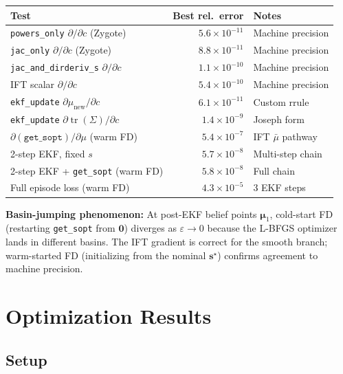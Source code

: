\documentclass[11pt,a4paper]{article}
\newcommand{\tr}{\operatorname{tr}}
\begin{document}
\begin{center}
\begin{tabular}{@{}lrl@{}}
\toprule
Test & Best rel.\ error & Notes \\
\midrule
\texttt{powers\_only} $\partial/\partial c$ (Zygote) & $5.6 \times 10^{-11}$ & Machine precision \\
\texttt{jac\_only} $\partial/\partial c$ (Zygote) & $8.8 \times 10^{-11}$ & Machine precision \\
\texttt{jac\_and\_dirderiv\_s} $\partial/\partial c$ & $1.1 \times 10^{-10}$ & Machine precision \\
IFT scalar $\partial/\partial c$ & $5.4 \times 10^{-10}$ & Machine precision \\
\texttt{ekf\_update} $\partial \mu_{\text{new}}/\partial c$ & $6.1 \times 10^{-11}$ & Custom rrule \\
\texttt{ekf\_update} $\partial \tr(\Sigma)/\partial c$ & $1.4 \times 10^{-9}$ & Joseph form \\
$\partial(\texttt{get\_sopt})/\partial \mu$ (warm FD) & $5.4 \times 10^{-7}$ & IFT $\bar\mu$ pathway \\
2-step EKF, fixed $s$ & $5.7 \times 10^{-8}$ & Multi-step chain \\
2-step EKF + \texttt{get\_sopt} (warm FD) & $5.8 \times 10^{-8}$ & Full chain \\
Full episode loss (warm FD) & $4.3 \times 10^{-5}$ & 3 EKF steps \\
\bottomrule
\end{tabular}
\end{center}

\textbf{Basin-jumping phenomenon:} At post-EKF belief points $\bm{\mu}_1$, cold-start FD (restarting \texttt{get\_sopt} from $\bm{0}$) diverges as $\varepsilon \to 0$ because the L-BFGS optimizer lands in different basins.  The IFT gradient is correct for the smooth branch; warm-started FD (initializing from the nominal $\bm{s}^\star$) confirms agreement to machine precision.

\section{Optimization Results}

\subsection{Setup}
\end{document}
